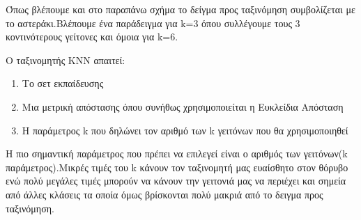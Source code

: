 Όπως βλέπουμε και στο παραπάνω σχήμα το δείγμα προς ταξινόμηση συμβολίζεται με το αστεράκι.Βλέπουμε ένα παράδειγμα για k=3 όπου συλλέγουμε τους 3 κοντινότερους γείτονες και όμοια για k=6.

Ο ταξινομητής ΚΝΝ απαιτεί:
\begin{enumerate}
	\item Το σετ εκπαίδευσης
	\item Μια μετρική απόστασης όπου συνήθως χρησιμοποιείται η Ευκλείδια Απόσταση
	\item Η παράμετρος k που δηλώνει τον αριθμό των k γειτόνων που θα χρησιμοποιηθεί
\end{enumerate}

Η πιο σημαντική παράμετρος που πρέπει να επιλεγεί είναι ο αριθμός των γειτόνων(k παράμετρος).Μικρές τιμές του k κάνουν τον ταξινομητή μας ευαίσθητο στον θόρυβο ενώ πολύ μεγάλες τιμές μπορούν να κάνουν την γειτονιά μας να περιέχει και σημεία από άλλες κλάσεις τα οποία όμως βρίσκονται πολύ μακριά από το δειγμα προς ταξινόμηση.

